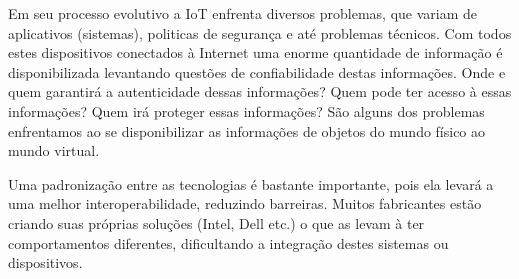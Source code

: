 Em seu processo evolutivo a IoT enfrenta diversos problemas, que variam de aplicativos (sistemas), politicas de segurança e até problemas técnicos. Com todos estes dispositivos conectados à Internet uma enorme quantidade de informação é disponibilizada levantando questões de confiabilidade destas informações. Onde e quem garantirá a autenticidade dessas informações? Quem pode ter acesso à essas informações? Quem irá proteger essas informações? São alguns dos problemas enfrentamos ao se disponibilizar as informações de objetos do mundo físico ao mundo virtual.

Uma padronização entre as tecnologias é bastante importante, pois ela levará a uma melhor interoperabilidade, reduzindo barreiras. Muitos fabricantes estão criando suas próprias soluções (Intel, Dell etc.) o que as levam à ter comportamentos diferentes, dificultando a integração destes sistemas ou dispositivos.